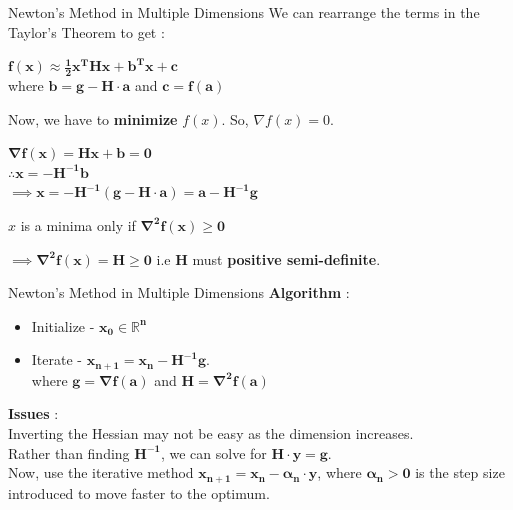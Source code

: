 \documentclass[10pt]{beamer}
\begin{document}
\begin{frame}[fragile]{Newton's Method in Multiple Dimensions}
 We can rearrange the terms in the Taylor's Theorem to get :
 \begin{center}
     $\boldsymbol{f(x) \approx \frac{1}{2}x^{T}Hx + b^{T}x + c}$
     \vspace{2mm}\ \\
     where $\boldsymbol{b = g - H \cdot a }$ and $\boldsymbol{c = f(a)} $
 \end{center}
 Now, we have to \textbf{minimize} $f(x)$. So, $\nabla f(x) = 0$.
 \begin{center}
     $\boldsymbol{\nabla f(x) = Hx + b =0}$
     \vspace{2mm}\ \\
     $\boldsymbol{\therefore x=-H^{-1}b}$
     \vspace{2mm}\ \\
     $\boldsymbol{\implies x=-H^{-1}(g-H\cdot a)=a-H^{-1}g}$
 \end{center}
 $x$ is a minima only if $\boldsymbol{\nabla ^{2}f(x) \geq 0}$
\vspace{2mm}\ \\
\begin{center}
    $\boldsymbol{\implies \nabla ^{2}f(x) = H \geq 0}$ i.e \textbf{H} must \textbf{positive semi-definite}.
\end{center}
\end{frame}

\begin{frame}[fragile]{Newton's Method in Multiple Dimensions}
 \textbf{Algorithm} :
 \begin{itemize}
     \item Initialize - $\boldsymbol{x_0 \in \mathbb{R}^{n}}$ 
     \vspace{3mm}
     \item Iterate - $\boldsymbol{x_{n+1}=x_n-H^{-1}g}$.
     \vspace{2mm}\ \\
     where $\boldsymbol{g=\nabla f(a)}$ and $\boldsymbol{H = \nabla ^{2}f(a)}$
   \end{itemize}
\textbf{Issues} :
 \vspace{3mm}\ \\
 Inverting the Hessian may not be easy as the dimension increases.
  \vspace{2mm}\ \\
 Rather than finding $\boldsymbol{H^{-1}}$, we can solve for $\boldsymbol{H \cdot y=g}$.
 \vspace{2mm}\ \\
 Now, use the iterative method $\boldsymbol{x_{n+1}=x_n-\alpha_{n}\cdot y}$, where $\boldsymbol{\alpha_{n} > 0}$ is the step size introduced to move faster to the optimum.
\end{frame}
\end{document}
